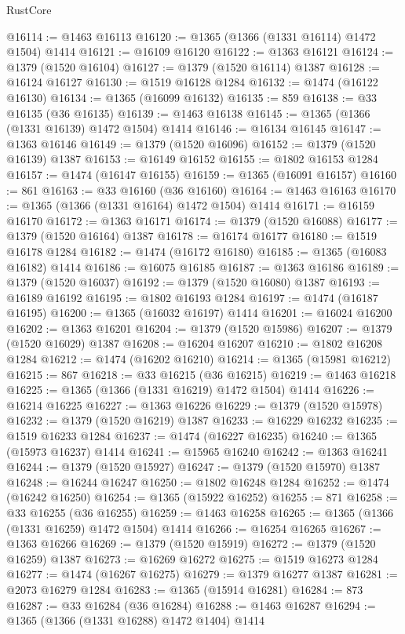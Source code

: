 \begin{lexlean}{RustCore}
\begin{coremodule}
@16114 := @1463 @16113
@16120 := @1365 (@1366 (@1331 @16114) @1472 @1504) @1414
@16121 := @16109 @16120
@16122 := @1363 @16121
@16124 := @1379 (@1520 @16104)
@16127 := @1379 (@1520 @16114) @1387
@16128 := @16124 @16127
@16130 := @1519 @16128 @1284
@16132 := @1474 (@16122 @16130)
@16134 := @1365 (@16099 @16132)
@16135 := 859
@16138 := @33 @16135 (@36 @16135)
@16139 := @1463 @16138
@16145 := @1365 (@1366 (@1331 @16139) @1472 @1504) @1414
@16146 := @16134 @16145
@16147 := @1363 @16146
@16149 := @1379 (@1520 @16096)
@16152 := @1379 (@1520 @16139) @1387
@16153 := @16149 @16152
@16155 := @1802 @16153 @1284
@16157 := @1474 (@16147 @16155)
@16159 := @1365 (@16091 @16157)
@16160 := 861
@16163 := @33 @16160 (@36 @16160)
@16164 := @1463 @16163
@16170 := @1365 (@1366 (@1331 @16164) @1472 @1504) @1414
@16171 := @16159 @16170
@16172 := @1363 @16171
@16174 := @1379 (@1520 @16088)
@16177 := @1379 (@1520 @16164) @1387
@16178 := @16174 @16177
@16180 := @1519 @16178 @1284
@16182 := @1474 (@16172 @16180)
@16185 := @1365 (@16083 @16182) @1414
@16186 := @16075 @16185
@16187 := @1363 @16186
@16189 := @1379 (@1520 @16037)
@16192 := @1379 (@1520 @16080) @1387
@16193 := @16189 @16192
@16195 := @1802 @16193 @1284
@16197 := @1474 (@16187 @16195)
@16200 := @1365 (@16032 @16197) @1414
@16201 := @16024 @16200
@16202 := @1363 @16201
@16204 := @1379 (@1520 @15986)
@16207 := @1379 (@1520 @16029) @1387
@16208 := @16204 @16207
@16210 := @1802 @16208 @1284
@16212 := @1474 (@16202 @16210)
@16214 := @1365 (@15981 @16212)
@16215 := 867
@16218 := @33 @16215 (@36 @16215)
@16219 := @1463 @16218
@16225 := @1365 (@1366 (@1331 @16219) @1472 @1504) @1414
@16226 := @16214 @16225
@16227 := @1363 @16226
@16229 := @1379 (@1520 @15978)
@16232 := @1379 (@1520 @16219) @1387
@16233 := @16229 @16232
@16235 := @1519 @16233 @1284
@16237 := @1474 (@16227 @16235)
@16240 := @1365 (@15973 @16237) @1414
@16241 := @15965 @16240
@16242 := @1363 @16241
@16244 := @1379 (@1520 @15927)
@16247 := @1379 (@1520 @15970) @1387
@16248 := @16244 @16247
@16250 := @1802 @16248 @1284
@16252 := @1474 (@16242 @16250)
@16254 := @1365 (@15922 @16252)
@16255 := 871
@16258 := @33 @16255 (@36 @16255)
@16259 := @1463 @16258
@16265 := @1365 (@1366 (@1331 @16259) @1472 @1504) @1414
@16266 := @16254 @16265
@16267 := @1363 @16266
@16269 := @1379 (@1520 @15919)
@16272 := @1379 (@1520 @16259) @1387
@16273 := @16269 @16272
@16275 := @1519 @16273 @1284
@16277 := @1474 (@16267 @16275)
@16279 := @1379 @16277 @1387
@16281 := @2073 @16279 @1284
@16283 := @1365 (@15914 @16281)
@16284 := 873
@16287 := @33 @16284 (@36 @16284)
@16288 := @1463 @16287
@16294 := @1365 (@1366 (@1331 @16288) @1472 @1404) @1414

\end{coremodule}
\end{lexlean}
